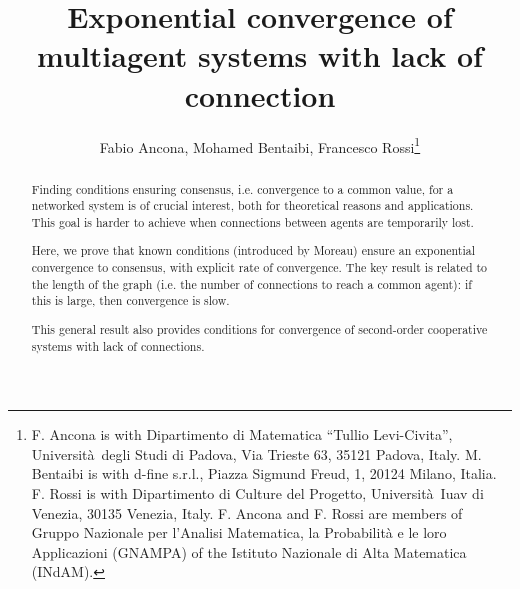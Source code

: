 \documentclass[journal]{article}
\begin{document}

\title{Exponential convergence of multiagent systems with lack of connection} %



\author{Fabio Ancona, Mohamed Bentaibi, Francesco Rossi\thanks{F. Ancona is with Dipartimento di Matematica ``Tullio Levi-Civita'', Universit\`a\ degli Studi di Padova, Via Trieste 63, 35121 Padova, Italy. M. Bentaibi is with d-fine s.r.l., Piazza Sigmund Freud, 1, 20124 Milano, Italia. F. Rossi is with Dipartimento di Culture del Progetto, Universit\`a\ Iuav di Venezia, 30135 Venezia, Italy. F. Ancona and F. Rossi are members of Gruppo Nazionale per l'Analisi Matematica, la Probabilit\`a e le loro Applicazioni (GNAMPA) of the Istituto Nazionale di Alta Matematica (INdAM).}}
\maketitle



          


\begin{abstract}                          %
Finding conditions ensuring consensus, i.e. convergence to a common value, for a networked system is of crucial interest, both for theoretical reasons and applications. This goal is harder to achieve when connections between agents are temporarily lost.

Here, we prove that known conditions (introduced by Moreau) ensure an exponential convergence to consensus, with explicit rate of convergence. The key result is related to the length of the graph (i.e. the number of connections to reach a common agent): if this is large, then convergence is slow.

This general result also provides conditions for convergence of second-order cooperative systems with lack of connections.
 \end{abstract}
\end{document}

